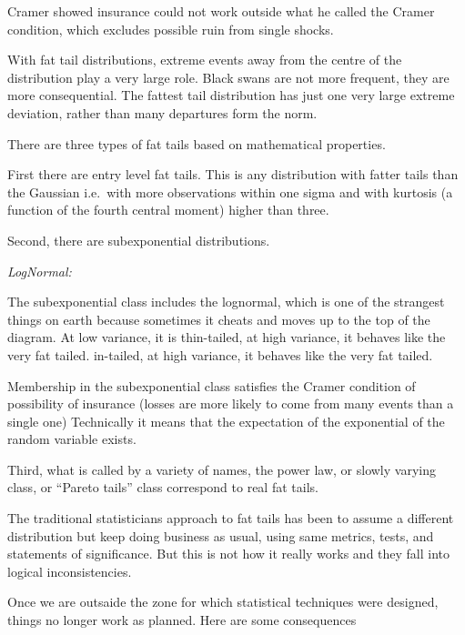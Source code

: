 \documentclass[
]{book}
\begin{document}
Cramer showed insurance could not work outside
what he called the Cramer condition, which excludes possible
ruin from single shocks.

With fat tail distributions, extreme events
away from the centre of the distribution play a very large
role. Black swans are not more frequent, they are more
consequential. The fattest tail distribution has just one very
large extreme deviation, rather than many departures form the
norm.

There are three types of fat tails based on mathematical properties.

First there are entry level fat tails.
This is any distribution with fatter tails than the Gaussian
i.e.~with more observations within one sigma and with
kurtosis (a function of the fourth central moment) higher than three.

Second, there are subexponential distributions.

\emph{LogNormal:}

The subexponential class includes the lognormal, which is one
of the strangest things on earth because sometimes it cheats
and moves up to the top of the diagram. At low variance, it is
thin-tailed, at high variance, it behaves like the very fat tailed.
in-tailed, at high variance, it behaves like the very fat tailed.

Membership in the subexponential class satisfies the Cramer
condition of possibility of insurance (losses are more likely to
come from many events than a single one)
Technically it means that the expectation of
the exponential of the random variable exists.

Third, what is called by a variety of names, the power law, or slowly
varying class, or ``Pareto tails'' class correspond to real fat tails.

The traditional statisticians approach to fat tails has been
to assume a different distribution but keep doing business as
usual, using same metrics, tests, and statements of significance.
But this is not how it really works and they fall into logical
inconsistencies.

Once we are outsaide the zone for which statistical techniques were designed,
things no longer work as planned.
Here are some consequences
\end{document}
